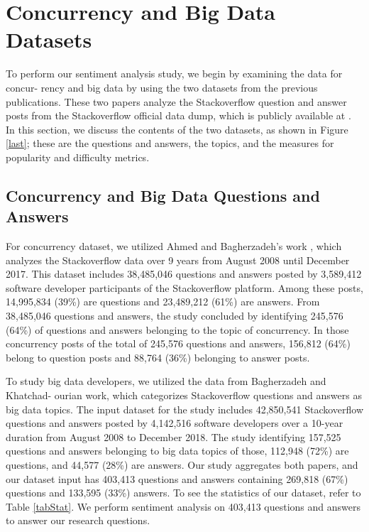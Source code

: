 \section{Concurrency and Big Data Datasets}

To perform our sentiment analysis study, we begin by examining the data for concur- rency \cite{ahmed2018concurrency} and big data \cite{bagherzadeh2019going} by using the two datasets from the previous publications. These two papers analyze the Stackoverflow question and answer posts from the Stackoverflow official data dump, which is publicly available at \cite{stackoverflow2019}. In this section, we discuss the contents of the two datasets, as shown in Figure \ref{last}; these are the questions and answers, the topics, and the measures for popularity and difficulty metrics.

\subsection{Concurrency and Big Data Questions and Answers}
\label{dataset}
For concurrency dataset, we utilized Ahmed and Bagherzadeh's work \cite{ahmed2018concurrency}, which analyzes the Stackoverflow data over 9 years from August 2008 until December 2017. This dataset includes 38,485,046 questions and answers posted by 3,589,412 software developer participants of the Stackoverflow platform. Among these posts, 14,995,834 (39\%) are questions and 23,489,212 (61\%) are answers. From 38,485,046 questions and answers, the study concluded by identifying 245,576 (64\%) of questions and answers belonging to the topic of concurrency. In those concurrency posts of the total of 245,576 questions and answers, 156,812 (64\%) belong to question posts and 88,764 (36\%) belonging to answer posts.

To study big data developers, we utilized the data from Bagherzadeh and Khatchad- ourian \cite{bagherzadeh2019going} work, which categorizes Stackoverflow questions and answers as big data topics. The input dataset for the study includes 42,850,541 Stackoverflow questions and answers posted by 4,142,516 software developers over a 10-year duration from August 2008 to December 2018. The study identifying 157,525 questions and answers belonging to big data topics of those, 112,948 (72\%) are questions, and 44,577 (28\%) are answers. Our study aggregates both papers, and our dataset input has 403,413 questions and answers containing 269,818 (67\%) questions and 133,595 (33\%) answers. To see the statistics of our dataset, refer to Table \ref{tabStat}. We perform sentiment analysis on 403,413 questions and answers to answer our research questions.

